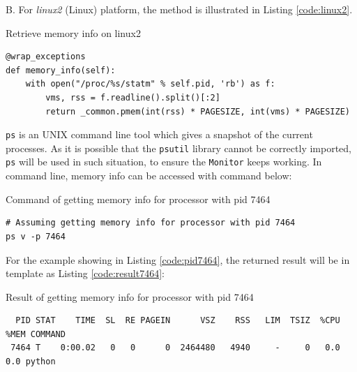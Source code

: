 \documentclass[10pt,twoside,openright,logo]{report}
\begin{document}
\noindent
B. For \textit{linux2} (Linux) platform, the method is illustrated in Listing \ref{code:linux2}.
\begin{listing}
\caption{Retrieve memory info on linux2}
\label{code:linux2}
\begin{verbatim}
@wrap_exceptions
def memory_info(self):
    with open("/proc/%s/statm" % self.pid, 'rb') as f:
        vms, rss = f.readline().split()[:2]
        return _common.pmem(int(rss) * PAGESIZE, int(vms) * PAGESIZE)
\end{verbatim}
\end{listing}


\texttt{ps} is an UNIX command line tool which gives a snapshot of the current processes.
As it is possible that the \texttt{psutil} library cannot be correctly imported, \texttt{ps} will be used in such situation, to ensure the \texttt{Monitor} keeps working.
In command line, memory info can be accessed with command below:
\begin{listing}
\caption{Command of getting memory info for processor with pid 7464}
\label{code:pid7464}
\begin{verbatim}
# Assuming getting memory info for processor with pid 7464
ps v -p 7464
\end{verbatim}
\end{listing}
For the example showing in Listing \ref{code:pid7464}, the returned result will be in template as Listing \ref{code:result7464}:

\begin{listing}
\caption{Result of getting memory info for processor with pid 7464}
\label{code:result7464}
\begin{verbatim}
  PID STAT    TIME  SL  RE PAGEIN      VSZ    RSS   LIM  TSIZ  %CPU %MEM COMMAND
 7464 T    0:00.02   0   0      0  2464480   4940     -     0   0.0  0.0 python
\end{verbatim}
\end{listing}
\end{document}
